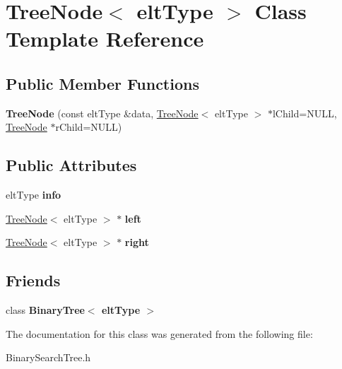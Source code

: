 \hypertarget{classTreeNode}{\section{Tree\-Node$<$ elt\-Type $>$ Class Template Reference}
\label{classTreeNode}
}
\subsection*{Public Member Functions}
\begin{DoxyCompactItemize}
\item 
\hypertarget{classTreeNode_a3595f0674593914acb2ed0feec36de03}{{\bfseries Tree\-Node} (const elt\-Type \&data, \hyperlink{classTreeNode}{Tree\-Node}$<$ elt\-Type $>$ $\ast$l\-Child=N\-U\-L\-L, \hyperlink{classTreeNode}{Tree\-Node} $\ast$r\-Child=N\-U\-L\-L)}\label{classTreeNode_a3595f0674593914acb2ed0feec36de03}

\end{DoxyCompactItemize}
\subsection*{Public Attributes}
\begin{DoxyCompactItemize}
\item 
\hypertarget{classTreeNode_a301b2e909375953619844944532a3952}{elt\-Type {\bfseries info}}\label{classTreeNode_a301b2e909375953619844944532a3952}

\item 
\hypertarget{classTreeNode_ab9b72e3a55181dd966a2317323181106}{\hyperlink{classTreeNode}{Tree\-Node}$<$ elt\-Type $>$ $\ast$ {\bfseries left}}\label{classTreeNode_ab9b72e3a55181dd966a2317323181106}

\item 
\hypertarget{classTreeNode_a155337c4a615a9a80fe951bd295ec996}{\hyperlink{classTreeNode}{Tree\-Node}$<$ elt\-Type $>$ $\ast$ {\bfseries right}}\label{classTreeNode_a155337c4a615a9a80fe951bd295ec996}

\end{DoxyCompactItemize}
\subsection*{Friends}
\begin{DoxyCompactItemize}
\item 
\hypertarget{classTreeNode_a242cd44fb1555200321ae2ab92ec68a6}{class {\bfseries Binary\-Tree$<$ elt\-Type $>$}}\label{classTreeNode_a242cd44fb1555200321ae2ab92ec68a6}

\end{DoxyCompactItemize}


The documentation for this class was generated from the following file\-:\begin{DoxyCompactItemize}
\item 
Binary\-Search\-Tree.\-h\end{DoxyCompactItemize}
